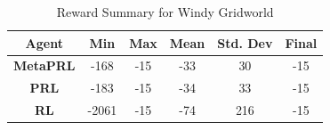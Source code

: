 \begin{table}[h]
\centering
\begin{tabular}{|c|c|c|c|c|c|}
\hline
\textbf{Agent} & \textbf{Min} & \textbf{Max} & \textbf{Mean} & \textbf{Std. Dev} & \textbf{Final}\\ \hline
\textbf{MetaPRL} & -168 & -15 & -33 & 30 & -15\\ \hline
\textbf{PRL} & -183 & -15 & -34 & 33 & -15\\ \hline
\textbf{RL} & -2061 & -15 & -74 & 216 & -15 \\ \hline
\end{tabular}
\caption{Reward Summary for Windy Gridworld}
\label{tab:example_table}
\end{table}







